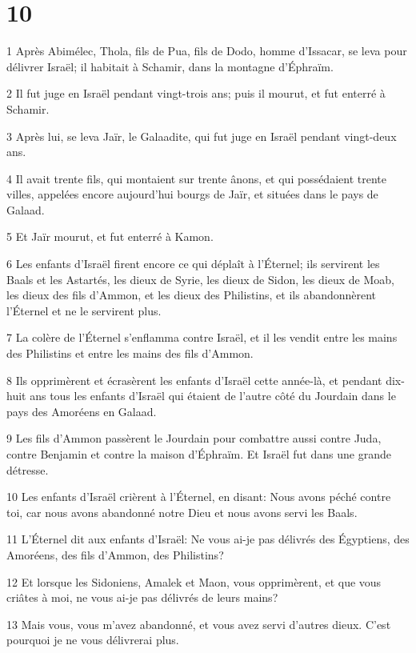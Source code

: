\chapter{10}

\par 1 Après Abimélec, Thola, fils de Pua, fils de Dodo, homme d'Issacar, se leva pour délivrer Israël; il habitait à Schamir, dans la montagne d'Éphraïm.
\par 2 Il fut juge en Israël pendant vingt-trois ans; puis il mourut, et fut enterré à Schamir.
\par 3 Après lui, se leva Jaïr, le Galaadite, qui fut juge en Israël pendant vingt-deux ans.
\par 4 Il avait trente fils, qui montaient sur trente ânons, et qui possédaient trente villes, appelées encore aujourd'hui bourgs de Jaïr, et situées dans le pays de Galaad.
\par 5 Et Jaïr mourut, et fut enterré à Kamon.
\par 6 Les enfants d'Israël firent encore ce qui déplaît à l'Éternel; ils servirent les Baals et les Astartés, les dieux de Syrie, les dieux de Sidon, les dieux de Moab, les dieux des fils d'Ammon, et les dieux des Philistins, et ils abandonnèrent l'Éternel et ne le servirent plus.
\par 7 La colère de l'Éternel s'enflamma contre Israël, et il les vendit entre les mains des Philistins et entre les mains des fils d'Ammon.
\par 8 Ils opprimèrent et écrasèrent les enfants d'Israël cette année-là, et pendant dix-huit ans tous les enfants d'Israël qui étaient de l'autre côté du Jourdain dans le pays des Amoréens en Galaad.
\par 9 Les fils d'Ammon passèrent le Jourdain pour combattre aussi contre Juda, contre Benjamin et contre la maison d'Éphraïm. Et Israël fut dans une grande détresse.
\par 10 Les enfants d'Israël crièrent à l'Éternel, en disant: Nous avons péché contre toi, car nous avons abandonné notre Dieu et nous avons servi les Baals.
\par 11 L'Éternel dit aux enfants d'Israël: Ne vous ai-je pas délivrés des Égyptiens, des Amoréens, des fils d'Ammon, des Philistins?
\par 12 Et lorsque les Sidoniens, Amalek et Maon, vous opprimèrent, et que vous criâtes à moi, ne vous ai-je pas délivrés de leurs mains?
\par 13 Mais vous, vous m'avez abandonné, et vous avez servi d'autres dieux. C'est pourquoi je ne vous délivrerai plus.
